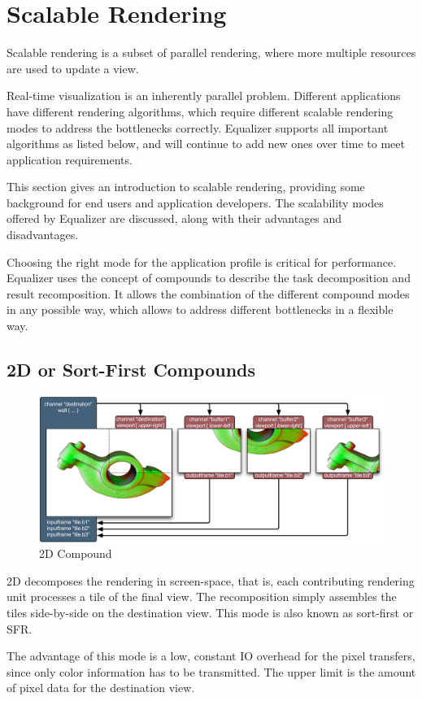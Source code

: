\documentclass[10pt,a4]{scrartcl}
\begin{document}
\section{Scalable Rendering}

Scalable rendering is a subset of parallel rendering, where more multiple
resources are used to update a view.

Real-time visualization is an inherently parallel problem. Different
applications have different rendering algorithms, which require different
scalable rendering modes to address the bottlenecks correctly. Equalizer
supports all important algorithms as listed below, and will continue to add new
ones over time to meet application requirements.

This section gives an introduction to scalable rendering, providing some
background for end users and application developers. The scalability
modes offered by Equalizer are discussed, along with their advantages
and disadvantages.

Choosing the right mode for the application profile is critical for
performance. Equalizer uses the concept of compounds to describe the
task decomposition and result recomposition. It allows the combination
of the different compound modes in any possible way, which allows to
address different bottlenecks in a flexible way.


\subsection{2D or Sort-First Compounds}

\begin{figure}
  \includegraphics[width=.618\textwidth]{images/2D.pdf}
  {\caption{2D Compound}}
\end{figure}
2D decomposes the rendering in screen-space, that is, each contributing
rendering unit processes a tile of the final view. The recomposition
simply assembles the tiles side-by-side on the destination view. This
mode is also known as sort-first or SFR.

The advantage of this mode is a low, constant IO overhead for the pixel
transfers, since only color information has to be transmitted. The upper
limit is the amount of pixel data for the destination view.
\end{document}
